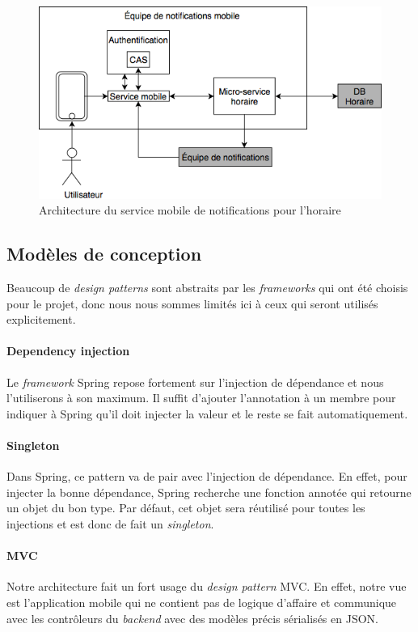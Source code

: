	\begin{figure}[hp]
		\centering
		\includegraphics[width=\textwidth]{Figures/Architecture}
		\caption{Architecture du service mobile de notifications pour l’horaire}
		\label{fig.architecture}
	\end{figure}


	\subsection{Modèles de conception}
	Beaucoup de \emph{design patterns} sont abstraits par les \emph{frameworks} qui ont été choisis pour le projet, donc nous nous sommes limités ici à ceux qui seront utilisés explicitement.
	\paragraph{Dependency injection} Le \emph{framework} Spring repose fortement sur l’injection de dépendance et nous l’utiliserons à son maximum. Il suffit d’ajouter l’annotation  à un membre pour indiquer à Spring qu’il doit injecter la valeur et le reste se fait automatiquement.
	\paragraph{Singleton} Dans Spring, ce pattern va de pair avec l’injection de dépendance. En effet, pour injecter la bonne dépendance, Spring recherche une fonction annotée  qui retourne un objet du bon type. Par défaut, cet objet sera réutilisé pour toutes les injections et est donc de fait un \emph{singleton}.
	\paragraph{MVC} Notre architecture fait un fort usage du \emph{design pattern} MVC. En effet, notre vue est l’application mobile qui ne contient pas de logique d’affaire et communique avec les contrôleurs du \emph{backend} avec des modèles précis sérialisés en JSON. 